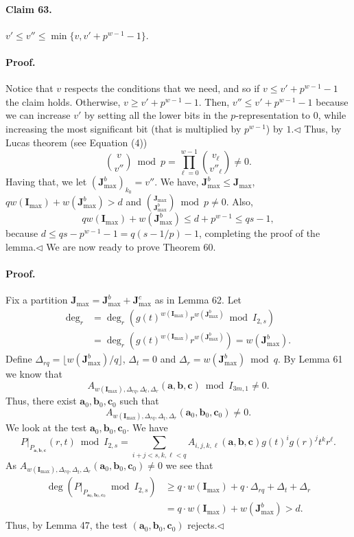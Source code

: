 \documentclass[10pt,a4paper]{article}
\begin{document}
\paragraph{Claim 63.} $v'\leq v''\leq\min\{v,v'+p^{w-1}-1\}$.
\paragraph{Proof.} Notice that $v$ respects the conditions that we need, and so if $v\leq v'+p^{w-1}-1$ the claim holds. Otherwise, $v\geq v'+p^{w-1}-1$. Then, $v''\leq v'+p^{w-1}-1$ because we can increase $v'$ by setting all the lower bits in the $p$-representation to $0$, while increasing the most significant bit (that is multiplied by $p^{w-1}$) by $1$.\hfill$\triangleleft$
Thus, by Lucas theorem (see Equation (4))
\[\binom v{v''}\bmod p=\prod_{\ell=0}^{w-1}\binom{v_\ell}{v''_\ell}\neq0.\]
Having that, we let $(\boldsymbol J_{\max}^b)_{k_0}=v''$. We have, $\boldsymbol J_{\max}^b\leq\boldsymbol J_{\max}$, $qw(\boldsymbol I_{\max})+w(\boldsymbol J_{\max}^b)>d$ and $\binom{\boldsymbol J_{\max}}{\boldsymbol J_{\max}^b}\bmod p\neq0$. Also,
\[qw(\boldsymbol I_{\max})+w(\boldsymbol J_{\max}^b)\leq d+p^{w-1}\leq qs-1,\]
because $d\leq qs-p^{w-1}-1=q(s-1/p)-1$, completing the proof of the lemma.\hfill$\triangleleft$
We are now ready to prove Theorem 60.
\paragraph{Proof.} Fix a partition $\boldsymbol J_{\max}=\boldsymbol J_{\max}^b+\boldsymbol J_{\max}^c$ as in Lemma 62. Let
\begin{align*}
\deg_r&=\deg_r(g(t)^{w(\boldsymbol I_{\max})}r^{w(\boldsymbol J_{\max}^b)}\bmod I_{2,s})\\
&=\deg_r(g(t)^{w(\boldsymbol I_{\max})}r^{w(\boldsymbol J_{\max}^b)})=w(\boldsymbol J_{\max}^b).
\end{align*}
Define $\Delta_{rq}=\lfloor w(\boldsymbol J_{\max}^b)/q\rfloor$, $\Delta_t=0$ and $\Delta_r=w(\boldsymbol J_{\max}^b)\bmod q$. By Lemma 61 we know that
\[A_{w(\boldsymbol I_{\max}),\Delta_{rq},\Delta_t,\Delta_r}(\boldsymbol a,\boldsymbol b,\boldsymbol c)\bmod I_{3m,1}\neq0.\]
Thus, there exist $\boldsymbol a_0,\boldsymbol b_0,\boldsymbol c_0$ such that
\[A_{w(\boldsymbol I_{\max}),\Delta_{rq},\Delta_t,\Delta_r}(\boldsymbol a_0,\boldsymbol b_0,\boldsymbol c_0)\neq0.\]
We look at the test $\boldsymbol a_0,\boldsymbol b_0,\boldsymbol c_0$. We have
\[P|_{P_{\boldsymbol a,\boldsymbol b,\boldsymbol c}}(r,t)\bmod I_{2,s}=\sum_{i+j<s,k,\ell<q}A_{i,j,k,\ell}(\boldsymbol a,\boldsymbol b,\boldsymbol c)g(t)^ig(r)^jt^kr^\ell.\]
As $A_{w(\boldsymbol I_{\max}),\Delta_{rq},\Delta_t,\Delta_r}(\boldsymbol a_0,\boldsymbol b_0,\boldsymbol c_0)\neq0$ we see that
\begin{align*}
\deg(P|_{P_{\boldsymbol a_0,\boldsymbol b_0,\boldsymbol c_0}}\bmod I_{2,s})
&\geq q\cdot w(\boldsymbol I_{\max})+q\cdot\Delta_{rq}+\Delta_t+\Delta_r\\
&=q\cdot w(\boldsymbol I_{\max})+w(\boldsymbol J_{\max}^b)>d.
\end{align*}
Thus, by Lemma 47, the test $(\boldsymbol a_0,\boldsymbol b_0,\boldsymbol c_0)$ rejects.\hfill$\triangleleft$
\end{document}
